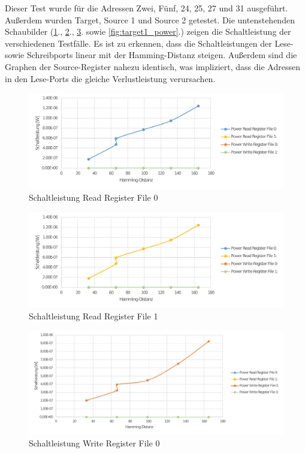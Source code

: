 Dieser Test wurde für die Adressen Zwei, Fünf, 24, 25, 27 und 31 ausgeführt. Außerdem wurden Target, Source 1 und Source 2 getestet. Die untenstehenden Schaubilder (\ref{fig:source0_power}., \ref{fig:source1_power}., \ref{fig:target0_power}. sowie \ref{fig:target1_power}.) zeigen die Schaltleistung der verschiedenen Testfälle. Es ist zu erkennen, dass die Schaltleistungen der Lese- sowie Schreibports linear mit der Hamming-Distanz steigen. Außerdem sind die Graphen der Source-Register nahezu identisch, was impliziert, dass die Adressen in den Lese-Ports die gleiche Verlustleistung verursachen.\\

\begin{figure}[H]
	\centering
	\includegraphics[width=\textwidth]{fig/source1_power.pdf}
	\caption{Schaltleistung Read Register File 0}
	\label{fig:source0_power}
\end{figure}
\begin{figure}[H]
	\centering
	\includegraphics[width=\textwidth]{fig/source2_power.pdf}
	\caption{Schaltleistung Read Register File 1}
	\label{fig:source1_power}
\end{figure}
\begin{figure}[H]
	\centering
	\includegraphics[width=\textwidth]{fig/register_eval_target_port0.pdf}
	\caption{Schaltleistung Write Register File 0}
	\label{fig:target0_power}
\end{figure}
